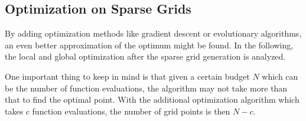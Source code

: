 \subsection{Optimization on Sparse Grids}

By adding optimization methods like gradient descent or evolutionary algorithms, an even better approximation of the optimum might be found. In the following, the local and global optimization after the sparse grid generation is analyzed. 

One important thing to keep in mind is that given a certain budget $ N $ which can be the number of function evaluations, the algorithm may not take more than that to find the optimal point. With the additional optimization algorithm which takes $ c $ function evaluations, the number of grid points is then $ N - c $. 







